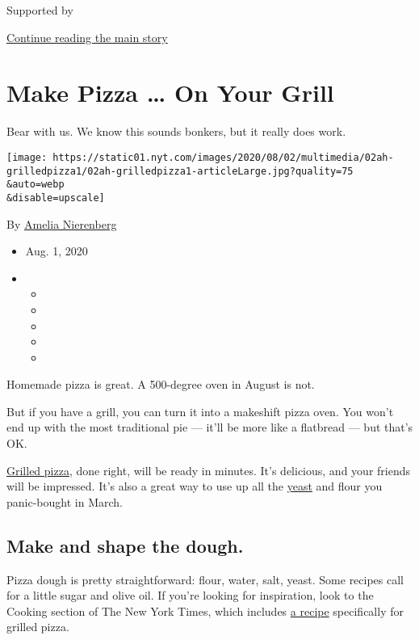 Supported by

\protect\hyperlink{after-sponsor}{Continue reading the main story}

\hypertarget{make-pizza--on-your-grill}{%
\section{Make Pizza \ldots{} On Your
Grill}\label{make-pizza--on-your-grill}}

Bear with us. We know this sounds bonkers, but it really does work.

\texttt{[image: https://static01.nyt.com/images/2020/08/02/multimedia/02ah-grilledpizza1/02ah-grilledpizza1-articleLarge.jpg?quality=75\\\&auto=webp\\\&disable=upscale]}

By \href{https://www.nytimes.com/by/amelia-nierenberg}{Amelia
Nierenberg}

\begin{itemize}
\item
  Aug. 1, 2020
\item
  \begin{itemize}
  \item
  \item
  \item
  \item
  \item
  \end{itemize}
\end{itemize}

Homemade pizza is great. A 500-degree oven in August is not.

But if you have a grill, you can turn it into a makeshift pizza oven.
You won't end up with the most traditional pie --- it'll be more like a
flatbread --- but that's OK.

\href{https://www.nytimes.com/2013/07/01/health/forgot-tofu-hot-dogs-pizza-on-the-grill.html}{Grilled
pizza}, done right, will be ready in minutes. It's delicious, and your
friends will be impressed. It's also a great way to use up all the
\href{https://slate.com/business/2020/04/yeast-shortage-supermarkets-coronavirus.html}{yeast}
and flour you panic-bought in March.

\hypertarget{make-and-shape-the-dough}{%
\subsection{Make and shape the dough.}\label{make-and-shape-the-dough}}

Pizza dough is pretty straightforward: flour, water, salt, yeast. Some
recipes call for a little sugar and olive oil. If you're looking for
inspiration, look to the Cooking section of The New York Times, which
includes
\href{https://cooking.nytimes.com/recipes/1014838-pizza-on-the-grill}{a
recipe} specifically for grilled pizza.

